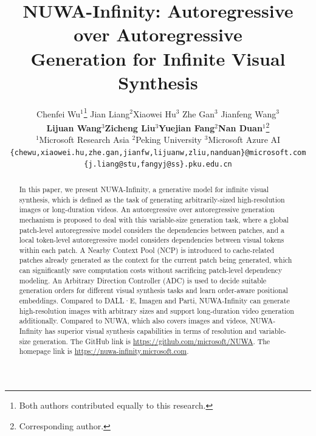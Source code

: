 \documentclass{article}
\title{NUWA-Infinity: Autoregressive over Autoregressive\\ Generation for Infinite Visual Synthesis}
\author{Chenfei Wu$^{1}$\thanks{Both authors contributed equally to this research.} \quad Jian Liang$^{2}$\samethanks[1] \quad Xiaowei Hu$^{3}$ \quad  Zhe Gan$^{3}$ \quad Jianfeng Wang$^{3}$\\ \textbf{Lijuan Wang}$^{3}$\quad  \textbf{Zicheng Liu}$^{3}$\quad  \textbf{Yuejian Fang}$^{2}$\quad \textbf{Nan Duan}$^{1}$\thanks{Corresponding author.} \\
 {$^{1}$Microsoft Research Asia \quad $^{2}$Peking University
 \quad $^{3}$Microsoft Azure AI} \\
{\tt\small\{chewu,xiaowei.hu,zhe.gan,jianfw,lijuanw,zliu,nanduan\}@microsoft.com}\\ {\tt\small\{j.liang@stu,fangyj@ss\}.pku.edu.cn}}
\begin{document}
\maketitle
\vspace{-9mm}

\begin{abstract}
\vspace{-4mm}
In this paper, we present NUWA-Infinity, a generative model for infinite visual synthesis, which is defined as the task of generating arbitrarily-sized high-resolution images or long-duration videos. An autoregressive over autoregressive generation mechanism is proposed to deal with this variable-size generation task, where a global patch-level autoregressive model considers the dependencies between patches, and a local token-level autoregressive model considers dependencies between visual tokens within each patch. A Nearby Context Pool (NCP) is introduced to cache-related patches already generated as the context for the current patch being generated, which can significantly save computation costs without sacrificing patch-level dependency modeling. An Arbitrary Direction Controller (ADC) is used to decide suitable generation orders for different visual synthesis tasks and learn order-aware positional embeddings. Compared to DALL·E, Imagen and Parti, NUWA-Infinity can generate high-resolution images with arbitrary sizes and support long-duration video generation additionally. Compared to NUWA, which also covers images and videos, NUWA-Infinity has superior visual synthesis capabilities in terms of resolution and variable-size generation. The GitHub link is \url{https://github.com/microsoft/NUWA}. The homepage link is \url{https://nuwa-infinity.microsoft.com}.

 
 




\end{abstract}
\end{document}
